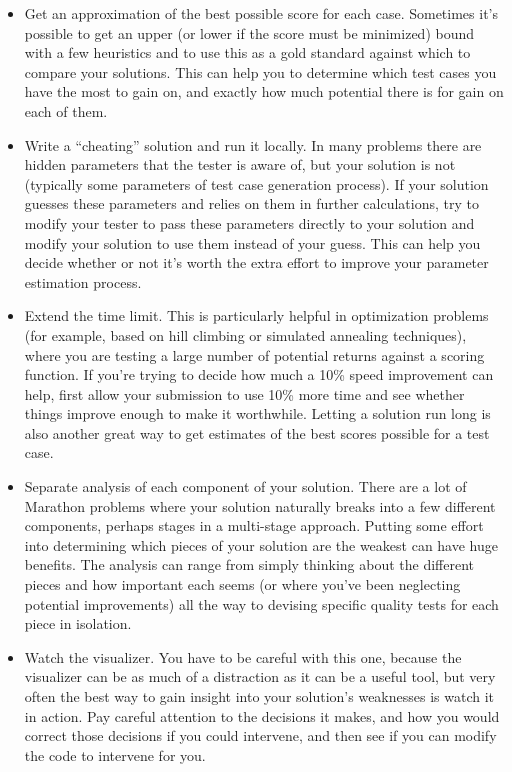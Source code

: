\documentclass[]{article}
\begin{document}
\begin{itemize}
\item
  Get an approximation of the best possible score for each case.
  Sometimes it's possible to get an upper (or lower if the score must be
  minimized) bound with a few heuristics and to use this as a gold
  standard against which to compare your solutions. This can help you to
  determine which test cases you have the most to gain on, and exactly
  how much potential there is for gain on each of them.
\item
  Write a ``cheating'' solution and run it locally. In many problems
  there are hidden parameters that the tester is aware of, but your
  solution is not (typically some parameters of test case generation
  process). If your solution guesses these parameters and relies on them
  in further calculations, try to modify your tester to pass these
  parameters directly to your solution and modify your solution to use
  them instead of your guess. This can help you decide whether or not
  it's worth the extra effort to improve your parameter estimation
  process.
\item
  Extend the time limit. This is particularly helpful in optimization
  problems (for example, based on hill climbing or simulated annealing
  techniques), where you are testing a large number of potential returns
  against a scoring function. If you're trying to decide how much a 10\%
  speed improvement can help, first allow your submission to use 10\%
  more time and see whether things improve enough to make it worthwhile.
  Letting a solution run long is also another great way to get estimates
  of the best scores possible for a test case.
\item
  Separate analysis of each component of your solution. There are a lot
  of Marathon problems where your solution naturally breaks into a few
  different components, perhaps stages in a multi-stage approach.
  Putting some effort into determining which pieces of your solution are
  the weakest can have huge benefits. The analysis can range from simply
  thinking about the different pieces and how important each seems (or
  where you've been neglecting potential improvements) all the way to
  devising specific quality tests for each piece in isolation.
\item
  Watch the visualizer. You have to be careful with this one, because
  the visualizer can be as much of a distraction as it can be a useful
  tool, but very often the best way to gain insight into your solution's
  weaknesses is watch it in action. Pay careful attention to the
  decisions it makes, and how you would correct those decisions if you
  could intervene, and then see if you can modify the code to intervene
  for you.
\end{itemize}
\end{document}
